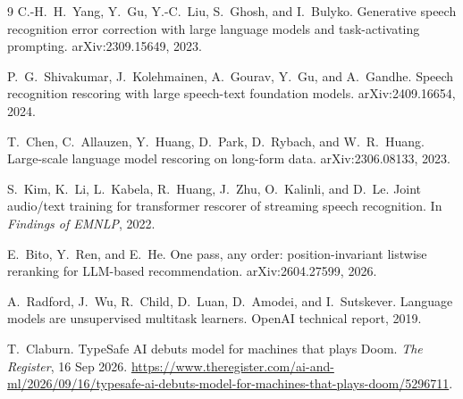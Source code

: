 \documentclass[11pt]{article}
\begin{document}
\begin{thebibliography}{9}
C.-H.~H.~Yang, Y.~Gu, Y.-C.~Liu, S.~Ghosh, and I.~Bulyko.
\newblock Generative speech recognition error correction with large language models and
  task-activating prompting.
\newblock arXiv:2309.15649, 2023.

P.~G.~Shivakumar, J.~Kolehmainen, A.~Gourav, Y.~Gu, and A.~Gandhe.
\newblock Speech recognition rescoring with large speech-text foundation models.
\newblock arXiv:2409.16654, 2024.

T.~Chen, C.~Allauzen, Y.~Huang, D.~Park, D.~Rybach, and W.~R.~Huang.
\newblock Large-scale language model rescoring on long-form data.
\newblock arXiv:2306.08133, 2023.

S.~Kim, K.~Li, L.~Kabela, R.~Huang, J.~Zhu, O.~Kalinli, and D.~Le.
\newblock Joint audio/text training for transformer rescorer of streaming speech
  recognition.
\newblock In \emph{Findings of EMNLP}, 2022.

E.~Bito, Y.~Ren, and E.~He.
\newblock One pass, any order: position-invariant listwise reranking for LLM-based
  recommendation.
\newblock arXiv:2604.27599, 2026.

A.~Radford, J.~Wu, R.~Child, D.~Luan, D.~Amodei, and I.~Sutskever.
\newblock Language models are unsupervised multitask learners.
\newblock OpenAI technical report, 2019.

T.~Claburn.
\newblock TypeSafe AI debuts model for machines that plays Doom.
\newblock \emph{The Register}, 16 Sep 2026.
\newblock \url{https://www.theregister.com/ai-and-ml/2026/09/16/typesafe-ai-debuts-model-for-machines-that-plays-doom/5296711}.

\end{thebibliography}
\end{document}
